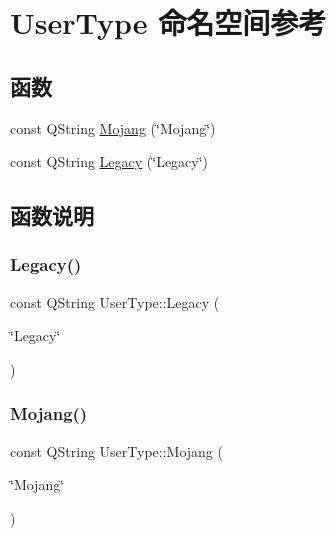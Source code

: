 \hypertarget{namespace_user_type}{}\section{User\+Type 命名空间参考}
\label{namespace_user_type}
\subsection*{函数}
\begin{DoxyCompactItemize}
\item 
const Q\+String \mbox{\hyperlink{namespace_user_type_aab8f7c0f7f99b6e3b6d220435b0576ac}{Mojang}} (\char`\"{}Mojang\char`\"{})
\item 
const Q\+String \mbox{\hyperlink{namespace_user_type_a938c1c88af5b7d51492731caac017683}{Legacy}} (\char`\"{}Legacy\char`\"{})
\end{DoxyCompactItemize}


\subsection{函数说明}
\mbox{\label{namespace_user_type_a938c1c88af5b7d51492731caac017683}} 
\subsubsection{\texorpdfstring{Legacy()}{Legacy()}}
{\footnotesize\ttfamily const Q\+String User\+Type\+::\+Legacy (\begin{DoxyParamCaption}\item[{\char`\"{}Legacy\char`\"{}}]{ }\end{DoxyParamCaption})}

\mbox{\label{namespace_user_type_aab8f7c0f7f99b6e3b6d220435b0576ac}} 
\subsubsection{\texorpdfstring{Mojang()}{Mojang()}}
{\footnotesize\ttfamily const Q\+String User\+Type\+::\+Mojang (\begin{DoxyParamCaption}\item[{\char`\"{}Mojang\char`\"{}}]{ }\end{DoxyParamCaption})}

